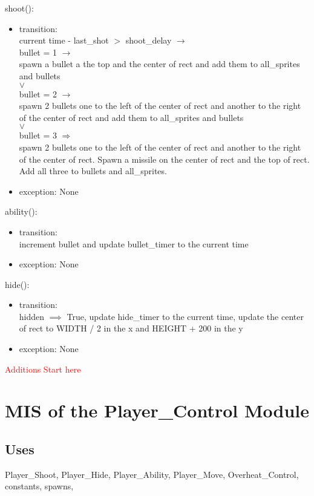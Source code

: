 \documentclass[12pt, titlepage]{article}
\begin{document}
\noindent shoot(): 
\begin{itemize}
\item transition:\\
current time - last\_shot $>$ shoot\_delay $\longrightarrow$\\
bullet = 1 $\longrightarrow$\\
spawn a bullet a the top and the center of rect and add them to all\_sprites and bullets\\
$\vee$\\
bullet = 2 $\longrightarrow$\\
spawn 2 bullets one to the left of the center of rect and another to the right of the center of rect and add them to all\_sprites and bullets\\
$\vee$\\
bullet = 3 $\Longrightarrow$\\
spawn 2 bullets one to the left of the center of rect and another to the right of the center of rect. Spawn a missile on the center of rect and the top of rect. Add all three to bullets and all\_sprites.
\item exception: None
\end{itemize}

\noindent ability(): 
\begin{itemize}
\item transition:\\
increment bullet and update bullet\_timer to the current time
\item exception: None
\end{itemize}

\noindent hide(): 
\begin{itemize}
\item transition:\\
hidden $\implies$ True, update hide\_timer to the current time, update the center of rect to WIDTH / 2 in the x and HEIGHT + 200 in the y
\item exception: None
\end{itemize}

\textcolor{red}{Additions Start here}
\section {MIS of the Player\_Control Module}

\subsection {Uses}
Player\_Shoot, Player\_Hide, Player\_Ability, Player\_Move, Overheat\_Control, constants, spawns, 
\end{document}
